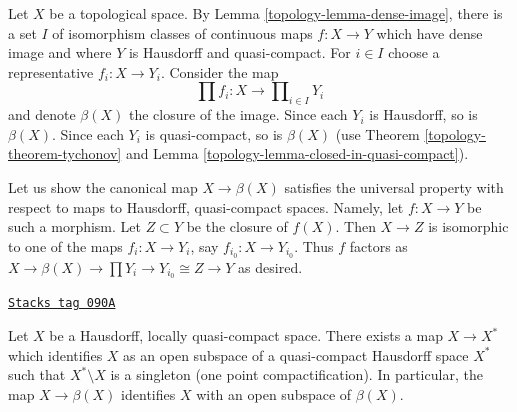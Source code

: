 Let $X$ be a topological space. By Lemma \ref{topology-lemma-dense-image}, there
is a set $I$
of isomorphism classes of continuous maps $f : X \to Y$ which have dense
image and where $Y$ is Hausdorff and quasi-compact. For $i \in I$ choose a
representative $f_i : X \to Y_i$. Consider the map
$$
\prod f_i : X \longrightarrow \prod\nolimits_{i \in I} Y_i
$$
and denote $\beta(X)$ the closure of the image. Since each $Y_i$ is
Hausdorff, so is $\beta(X)$. Since each $Y_i$ is quasi-compact, so
is $\beta(X)$ (use Theorem \ref{topology-theorem-tychonov} and
Lemma \ref{topology-lemma-closed-in-quasi-compact}).

\medskip\noindent
Let us show the canonical map $X \to \beta(X)$ satisfies the universal
property with respect to maps to Hausdorff, quasi-compact spaces. Namely,
let $f : X \to Y$ be such a morphism. Let $Z \subset Y$ be the closure
of $f(X)$. Then $X \to Z$ is isomorphic to one of the maps
$f_i : X \to Y_i$, say $f_{i_0} : X \to Y_{i_0}$. Thus $f$ factors as
$X \to \beta(X) \to \prod Y_i \to Y_{i_0} \cong Z \to Y$ as desired.

\begin{lemma}
\label{topology-lemma-one-point-compactification}
\href{https://stacks.math.columbia.edu/tag/090A}{\texttt{Stacks tag 090A}}

Let $X$ be a Hausdorff, locally quasi-compact space.
There exists a map $X \to X^*$ which identifies $X$ as an open
subspace of a quasi-compact Hausdorff space $X^*$ such that
$X^* \setminus X$ is a singleton (one point compactification).
In particular, the map $X \to \beta(X)$ identifies $X$
with an open subspace of $\beta(X)$.
\end{lemma}

